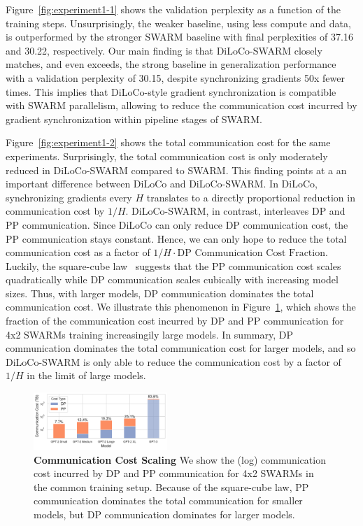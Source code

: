 \documentclass{article}
\begin{document}
Figure~\ref{fig:experiment1-1} shows the validation perplexity as a function of
the training steps. Unsurprisingly, the weaker baseline, using less compute and
data, is outperformed by the stronger SWARM baseline with final perplexities of 
37.16 and 30.22, respectively. Our main finding is that DiLoCo-SWARM closely
matches, and even exceeds, the strong baseline in generalization performance
with a validation perplexity of 30.15, despite synchronizing gradients 50x fewer
times. This implies that DiLoCo-style gradient synchronization is compatible
with SWARM parallelism, allowing to reduce the communication cost incurred by 
gradient synchronization within pipeline stages of SWARM.

Figure~\ref{fig:experiment1-2} shows the total communication cost for the same
experiments. Surprisingly, the total communication cost is only moderately
reduced in DiLoCo-SWARM compared to SWARM. This finding points at a an important
difference between DiLoCo and DiLoCo-SWARM. In DiLoCo, synchronizing gradients
every $H$ translates to a directly proportional reduction in communication cost
by $1/H$. DiLoCo-SWARM, in contrast, interleaves DP and PP communication. Since
DiLoCo can only reduce DP communication cost, the PP communication stays
constant.  Hence, we can only hope to reduce the total communication cost as a
factor of $1/H \cdot \text{DP Communication Cost Fraction}$. Luckily, the
square-cube law~\cite{ryabinin2023swarm} suggests that the PP communication cost
scales quadratically while DP communication scales cubically with increasing
model sizes. Thus, with larger models, DP communication dominates the total
communication cost. We illustrate this phenomenon in
Figure~\ref{fig:square-cube-law}, which shows the fraction of the communication
cost incurred by DP and PP communication for 4x2 SWARMs training increasingily
large models. In summary, DP communication dominates the total communication
cost for larger models, and so DiLoCo-SWARM is only able to reduce the
communication cost by a factor of $1/H$ in the limit of large models.

\begin{figure}[ht]
  \centering
  \includegraphics[width=0.45\textwidth]{figures/square-cube-law.pdf}
  \caption{\textbf{Communication Cost Scaling} We show the (log) communication
  cost incurred by DP and PP communication for 4x2 SWARMs in the common training
  setup. Because of the square-cube law, PP communication dominates the total communication for smaller models, but DP communication dominates for larger models.} 
  \label{fig:square-cube-law}
\end{figure}
\end{document}
